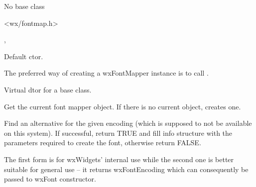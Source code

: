 
No base class


<wx/fontmap.h>


, 


\label{wxfontmapperwxfontmapper}


Default ctor.


The preferred way of creating a wxFontMapper instance is to call 
.

\label{wxfontmapperdtor}


Virtual dtor for a base class.

\label{wxfontmapperget}


Get the current font mapper object. If there is no current object, creates
one.



\label{wxfontmappergetaltforencoding}



Find an alternative for the given encoding (which is supposed to not be
available on this system). If successful, return TRUE and fill info
structure with the parameters required to create the font, otherwise
return FALSE.

The first form is for wxWidgets' internal use while the second one
is better suitable for general use -- it returns wxFontEncoding which
can consequently be passed to wxFont constructor.

